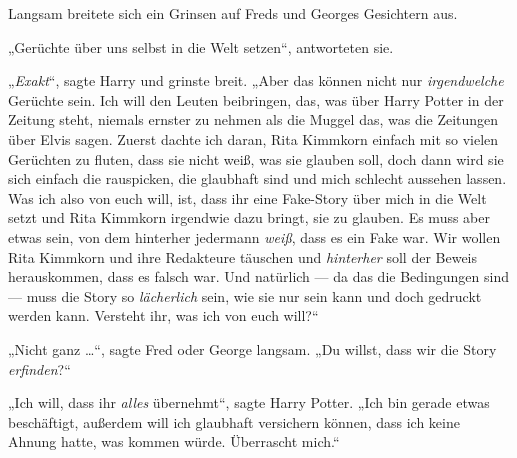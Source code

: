 Langsam breitete sich ein Grinsen auf Freds und Georges Gesichtern aus.

„Gerüchte über uns selbst in die Welt setzen“, antworteten sie.

„\emph{Exakt}“, sagte Harry und grinste breit.
„Aber das können nicht nur \emph{irgendwelche} Gerüchte sein. Ich will den Leuten beibringen, das, was über Harry Potter in der Zeitung steht, niemals ernster zu nehmen als die Muggel das, was die Zeitungen über Elvis sagen. Zuerst dachte ich daran, Rita Kimmkorn einfach mit so vielen Gerüchten zu fluten, dass sie nicht weiß, was sie glauben soll, doch dann wird sie sich einfach die rauspicken, die glaubhaft sind und mich schlecht aussehen lassen. Was ich also von euch will, ist, dass ihr eine Fake-Story über mich in die Welt setzt und Rita Kimmkorn irgendwie dazu bringt, sie zu glauben. Es muss aber etwas sein, von dem hinterher jedermann \emph{weiß}, dass es ein Fake war. Wir wollen Rita Kimmkorn und ihre Redakteure täuschen und \emph{hinterher} soll der Beweis herauskommen, dass es falsch war. Und natürlich — da das die Bedingungen sind — muss die Story so \emph{lächerlich} sein, wie sie nur sein kann und doch gedruckt werden kann. Versteht ihr, was ich von euch will?“

„Nicht ganz …“, sagte Fred oder George langsam.
„Du willst, dass wir die Story \emph{erfinden}?“

„Ich will, dass ihr \emph{alles} übernehmt“, sagte Harry Potter.
„Ich bin gerade etwas beschäftigt, außerdem will ich glaubhaft versichern können, dass ich keine Ahnung hatte, was kommen würde. Überrascht mich.“

